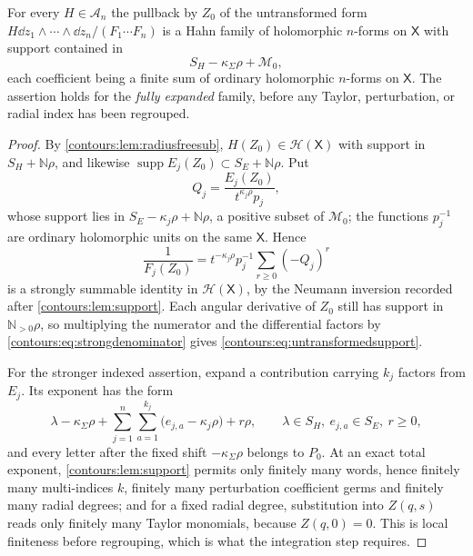 \documentclass[11pt,letterpaper]{article}
\theoremstyle{definition}
\theoremstyle{remark}
\newcommand{\N}{\mathbb N}\newcommand{\Z}{\mathbb Z}\newcommand{\DD}{\mathbb D}
\newcommand{\HH}{\mathcal H}\newcommand{\A}{\mathscr A}\newcommand{\OO}{\mathcal O}
\newcommand{\supp}{\operatorname{supp}}\newcommand{\Res}{\operatorname{Res}}
\numberwithin{equation}{section}
\begin{document}
\begin{proposition}
\label{contours:prop:admissiblepullback}
For every $H\in\A_n$ the pullback by $Z_0$ of the untransformed form
$H\dd z_1\wedge\cdots\wedge \dd z_n/(F_1\cdots F_n)$ is a Hahn family of
holomorphic $n$-forms on $\mathsf X$ with support contained in
\begin{equation}\label{contours:eq:untransformedsupport}
  S_H-\kappa_\Sigma\rho+\mathcal M_0 ,
\end{equation}
each coefficient being a finite sum of ordinary holomorphic $n$-forms on
$\mathsf X$. The assertion holds for the \emph{fully expanded} family, before any
Taylor, perturbation, or radial index has been regrouped.
\end{proposition}
\begin{proof}
By \cref{contours:lem:radiusfreesub}, $H(Z_0)\in\HH(\mathsf X)$ with support in
$S_H+\N\rho$, and likewise $\supp E_j(Z_0)\subset S_E+\N\rho$. Put
\[
  Q_j=\frac{E_j(Z_0)}{t^{\kappa_j\rho}p_j},
\]
whose support lies in $S_E-\kappa_j\rho+\N\rho$, a positive subset of
$\mathcal M_0$; the functions $p_j^{-1}$ are ordinary holomorphic units on the
same $\mathsf X$. Hence
\begin{equation}\label{contours:eq:strongdenominator}
  \frac1{F_j(Z_0)}
  =t^{-\kappa_j\rho}p_j^{-1}\sum_{r\ge0}(-Q_j)^r
\end{equation}
is a strongly summable identity in $\HH(\mathsf X)$, by the Neumann inversion
recorded after \cref{contours:lem:support}. Each angular derivative of $Z_0$
still has support in $\N_{>0}\rho$, so multiplying the numerator and the
differential factors by \eqref{contours:eq:strongdenominator} gives
\eqref{contours:eq:untransformedsupport}.

For the stronger indexed assertion, expand a contribution carrying $k_j$ factors
from $E_j$. Its exponent has the form
\begin{equation}\label{contours:eq:exponentaccounting}
  \lambda-\kappa_\Sigma\rho
  +\sum_{j=1}^n\sum_{a=1}^{k_j}\bigl(e_{j,a}-\kappa_j\rho\bigr)+r\rho,
  \qquad \lambda\in S_H,\ e_{j,a}\in S_E,\ r\ge0,
\end{equation}
and every letter after the fixed shift $-\kappa_\Sigma\rho$ belongs to $P_0$. At
an exact total exponent, \cref{contours:lem:support} permits only finitely many
words, hence finitely many multi-indices $k$, finitely many perturbation
coefficient germs and finitely many radial degrees; and for a fixed radial
degree, substitution into $Z(q,s)$ reads only finitely many Taylor monomials,
because $Z(q,0)=0$. This is local finiteness before regrouping, which is what
the integration step requires.
\end{proof}
\end{document}

